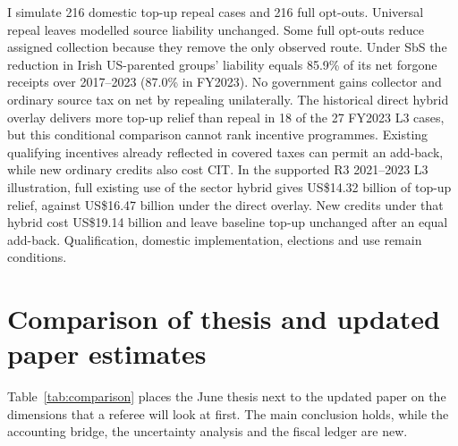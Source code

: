 \documentclass[11pt,a4paper]{article}
\newcommand{\usd}{US\$}
\begin{document}
I simulate 216 domestic top-up repeal cases and 216 full opt-outs. Universal repeal leaves modelled source liability unchanged. Some full opt-outs reduce assigned collection because they remove the only observed route. Under SbS the reduction in Irish US-parented groups' liability equals 85.9\% of its net forgone receipts over 2017–2023 (87.0\% in FY2023). No government gains collector and ordinary source tax on net by repealing unilaterally. The historical direct hybrid overlay delivers more top-up relief than repeal in 18 of the 27 FY2023 L3 cases, but this conditional comparison cannot rank incentive programmes. Existing qualifying incentives already reflected in covered taxes can permit an add-back, while new ordinary credits also cost CIT. In the supported R3 2021–2023 L3 illustration, full existing use of the sector hybrid gives \usd14.32 billion of top-up relief, against \usd16.47 billion under the direct overlay. New credits under that hybrid cost \usd19.14 billion and leave baseline top-up unchanged after an equal add-back. Qualification, domestic implementation, elections and use remain conditions.

\section[Comparison of thesis and paper]{Comparison of thesis and updated paper estimates}

Table~\ref{tab:comparison} places the June thesis next to the updated paper on the dimensions that a referee will look at first. The main conclusion holds, while the accounting bridge, the uncertainty analysis and the fiscal ledger are new.
\end{document}
